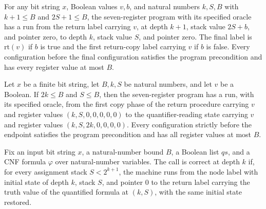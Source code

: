 \begin{theorem}
\label{Complexity.LogProg.TQBFARM.pop_run}
\leanok
{}
For any bit string $x$, Boolean values $v,b$, and natural numbers $k,S,B$ with $k+1\le
B$ and $2S+1\le B$, the seven-register program with its specified oracle has a run from
the return label carrying $v$, at depth $k+1$, stack value $2S+b$, and pointer zero, to
depth $k$, stack value $S$, and pointer zero. The final label is $\mathrm{rt}(v)$ if $b$
is true and the first return-copy label carrying $v$ if $b$ is false. Every
configuration before the final configuration satisfies the program precondition and has
every register value at most $B$.
\end{theorem}

\begin{theorem}
\label{Complexity.LogProg.TQBFARM.qlook_run}
\leanok
{}
Let $x$ be a finite bit string, let $B,k,S$ be natural numbers, and let $v$ be a
Boolean. If $2k\le B$ and $S\le B$, then the seven-register program has a run, with its
specified oracle, from the first copy phase of the return procedure carrying $v$ and
register values $(k,S,0,0,0,0,0)$ to the quantifier-reading state carrying $v$ and
register values $(k,S,2k,0,0,0,0)$. Every configuration strictly before the endpoint
satisfies the program precondition and has all register values at most $B$.
\end{theorem}

\begin{definition}
\label{Complexity.LogProg.TQBFARM.CallOK}
\leanok
{}
Fix an input bit string $x$, a natural-number bound $B$, a Boolean list $qs$, and a CNF
formula $\varphi$ over natural-number variables. The call is correct at depth $k$ if,
for every assignment stack $S<2^{k+1}$, the machine runs from the node label with
initial state of depth $k$, stack $S$, and pointer $0$ to the return label carrying the
truth value of the quantified formula at $(k,S)$, with the same initial state restored.
\end{definition}

